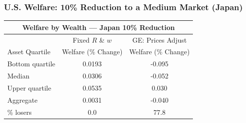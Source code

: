\documentclass[9pt,pdftex,aspectratio=1610]{beamer}
\theoremstyle{definition}
\begin{document}
\begin{frame}[t]
\frametitle{U.S. Welfare: 10\% Reduction to a Medium Market (Japan)}
\begin{table}[t]
\footnotesize
\setlength {\tabcolsep}{6.05mm}
\renewcommand{\arraystretch}{1.80}
\begin{center}
\begin{tabular}{l c c}
\multicolumn{3}{c}{\small \textbf{Welfare by Wealth --- Japan {\color{red} 10\%} Reduction}}\\
\hline
\hline
& \footnotesize  Fixed $R$ \& $w$ & GE: Prices Adjust \\
\cmidrule(lr){2-2}  \cmidrule(lr){3-3}
\footnotesize  Asset Quartile & \footnotesize  Welfare (\% Change) & \footnotesize  Welfare (\% Change) \\
\footnotesize  Bottom quartile  & 0.0193 & -0.095 \\
\footnotesize  Median & 0.0306 & -0.052 \\
\footnotesize  Upper quartile  & 0.0535 & 0.030  \\
\footnotesize  Aggregate & 0.0031 & -0.040 \\
\cmidrule(lr){2-2}  \cmidrule(lr){3-3}
\footnotesize  \% losers & 0.0 & 77.8\\
\hline
\end{tabular}
\end{center}
\end{table}
\end{frame}

\end{document}
